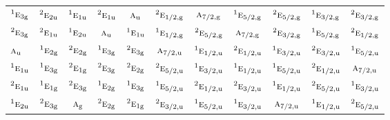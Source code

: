 \documentclass[10pt,a4paper]{article}
\numberwithin{equation}{section}
\newcommand{\irr}[1]{\text{\normalfont\scshape #1}}
\newcommand{\conjpair}[1]{{}^{#1}}
\newcommand{\ptag}[1]{\mathrm{#1}}
\begin{document}
{\begin{longtable}{@{}lcccccccccc@{}}
$\conjpair{1}\irr{e}_{3\ptag{g}}$ & $\conjpair{2}\irr{e}_{2\ptag{u}}$ & $\conjpair{1}\irr{e}_{1\ptag{u}}$ & $\conjpair{2}\irr{e}_{1\ptag{u}}$ & $\irr{a}_{\ptag{u}}$ & $\conjpair{2}\irr{e}_{1/2,\ptag{g}}$ & $\irr{a}_{7/2,\ptag{g}}$ & $\conjpair{1}\irr{e}_{5/2,\ptag{g}}$ & $\conjpair{2}\irr{e}_{5/2,\ptag{g}}$ & $\conjpair{1}\irr{e}_{3/2,\ptag{g}}$ & $\conjpair{2}\irr{e}_{3/2,\ptag{g}}$\\
$\conjpair{2}\irr{e}_{3\ptag{g}}$ & $\conjpair{2}\irr{e}_{1\ptag{u}}$ & $\conjpair{1}\irr{e}_{2\ptag{u}}$ & $\irr{a}_{\ptag{u}}$ & $\conjpair{1}\irr{e}_{1\ptag{u}}$ & $\conjpair{1}\irr{e}_{1/2,\ptag{g}}$ & $\conjpair{2}\irr{e}_{5/2,\ptag{g}}$ & $\irr{a}_{7/2,\ptag{g}}$ & $\conjpair{2}\irr{e}_{3/2,\ptag{g}}$ & $\conjpair{1}\irr{e}_{5/2,\ptag{g}}$ & $\conjpair{2}\irr{e}_{1/2,\ptag{g}}$\\
$\irr{a}_{\ptag{u}}$ & $\conjpair{1}\irr{e}_{2\ptag{g}}$ & $\conjpair{2}\irr{e}_{2\ptag{g}}$ & $\conjpair{1}\irr{e}_{3\ptag{g}}$ & $\conjpair{2}\irr{e}_{3\ptag{g}}$ & $\irr{a}_{7/2,\ptag{u}}$ & $\conjpair{1}\irr{e}_{1/2,\ptag{u}}$ & $\conjpair{2}\irr{e}_{1/2,\ptag{u}}$ & $\conjpair{1}\irr{e}_{3/2,\ptag{u}}$ & $\conjpair{2}\irr{e}_{3/2,\ptag{u}}$ & $\conjpair{1}\irr{e}_{5/2,\ptag{u}}$\\
$\conjpair{1}\irr{e}_{1\ptag{u}}$ & $\conjpair{1}\irr{e}_{3\ptag{g}}$ & $\conjpair{2}\irr{e}_{1\ptag{g}}$ & $\conjpair{2}\irr{e}_{3\ptag{g}}$ & $\conjpair{2}\irr{e}_{2\ptag{g}}$ & $\conjpair{2}\irr{e}_{5/2,\ptag{u}}$ & $\conjpair{1}\irr{e}_{3/2,\ptag{u}}$ & $\conjpair{1}\irr{e}_{1/2,\ptag{u}}$ & $\conjpair{1}\irr{e}_{5/2,\ptag{u}}$ & $\conjpair{2}\irr{e}_{1/2,\ptag{u}}$ & $\irr{a}_{7/2,\ptag{u}}$\\
$\conjpair{2}\irr{e}_{1\ptag{u}}$ & $\conjpair{1}\irr{e}_{1\ptag{g}}$ & $\conjpair{2}\irr{e}_{3\ptag{g}}$ & $\conjpair{1}\irr{e}_{2\ptag{g}}$ & $\conjpair{1}\irr{e}_{3\ptag{g}}$ & $\conjpair{1}\irr{e}_{5/2,\ptag{u}}$ & $\conjpair{2}\irr{e}_{1/2,\ptag{u}}$ & $\conjpair{2}\irr{e}_{3/2,\ptag{u}}$ & $\conjpair{1}\irr{e}_{1/2,\ptag{u}}$ & $\conjpair{2}\irr{e}_{5/2,\ptag{u}}$ & $\conjpair{1}\irr{e}_{3/2,\ptag{u}}$\\
$\conjpair{1}\irr{e}_{2\ptag{u}}$ & $\conjpair{2}\irr{e}_{3\ptag{g}}$ & $\irr{a}_{\ptag{g}}$ & $\conjpair{2}\irr{e}_{2\ptag{g}}$ & $\conjpair{2}\irr{e}_{1\ptag{g}}$ & $\conjpair{2}\irr{e}_{3/2,\ptag{u}}$ & $\conjpair{1}\irr{e}_{5/2,\ptag{u}}$ & $\conjpair{1}\irr{e}_{3/2,\ptag{u}}$ & $\irr{a}_{7/2,\ptag{u}}$ & $\conjpair{1}\irr{e}_{1/2,\ptag{u}}$ & $\conjpair{2}\irr{e}_{5/2,\ptag{u}}$\\

\end{longtable}}
\end{document}
